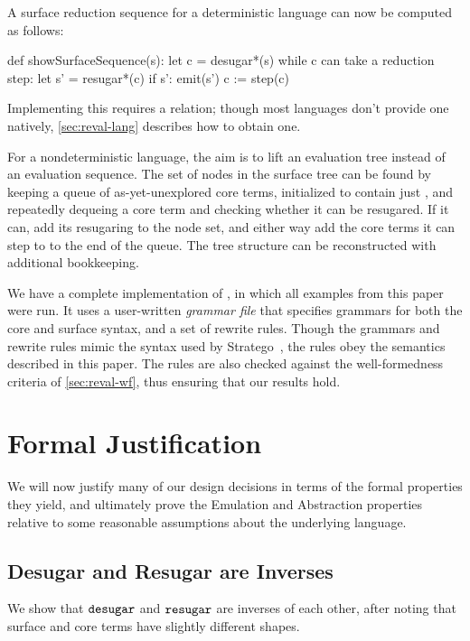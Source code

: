 A surface reduction sequence for a deterministic language can now be
computed as follows:
\begin{Codes}
def showSurfaceSequence(s):
  let c = desugar*(s)
  while c can take a reduction step:
    let s' = resugar*(c)
    if s': emit(s')
    c := step(c)
\end{Codes}
Implementing
this requires a  relation; though most languages
don't provide one natively, {\cref{sec:reval-lang}} describes how to
obtain one.

For a nondeterministic language, the aim is to lift an evaluation tree
instead of an evaluation sequence. The set of nodes in the surface tree
can be found by keeping a queue of as-yet-unexplored core terms,
initialized to contain just , and repeatedly dequeing a
core term and checking whether it can be resugared. If it can, add its
resugaring to the node set, and either way add the core terms it can step to to the end of
the queue. The tree structure can be reconstructed with additional
bookkeeping.

We have a complete implementation of {\Resugarer}, in
which all examples from this paper were run. It uses a user-written
\emph{grammar file} that specifies grammars for both the core and surface
syntax, and a set of rewrite rules. Though the grammars and rewrite rules
mimic the syntax used by Stratego~\cite{stratego}, the rules obey the semantics described in this
paper. The rules are also checked against the well-formedness criteria of
\cref{sec:reval-wf}, thus ensuring that our results hold.


\section{Formal Justification}
\label{sec:formal}

We will now justify many of our design decisions in terms of the formal
properties they yield, and ultimately prove the Emulation and Abstraction
properties relative to some reasonable assumptions about the underlying
language.

\subsection{Desugar and Resugar are Inverses}
\label{sec:inverses}

We show that $\texttt{desugar}$ and $\texttt{resugar}$ are inverses of each
other, after noting that surface and core terms have slightly
different shapes.

